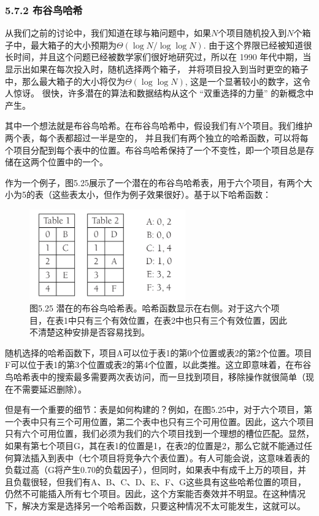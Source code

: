 \documentclass[a4paper]{ctexart}
\theoremstyle{definition}
\theoremstyle{definition}
\begin{document}
\subsubsection{5.7.2 布谷鸟哈希}

从我们之前的讨论中，我们知道在球与箱问题中，如果\( N \)个项目随机投入到\( N \)个箱子中，最大箱子的大小预期为\( \Theta(\log N / \log \log N) \). 
由于这个界限已经被知道很长时间，并且这个问题已经被数学家们很好地研究过，所以在 1990 年代中期，当显示出如果在每次投入时，随机选择两个箱子，
并将项目投入到当时更空的箱子中，那么最大箱子的大小将仅为\( \Theta(\log \log N) \), 这是一个显著较小的数字，这令人惊讶。
很快，许多潜在的算法和数据结构从这个 ``双重选择的力量'' 的新概念中产生。

其中一个想法就是布谷鸟哈希。在布谷鸟哈希中，假设我们有\( N \)个项目。我们维护两个表，每个表都超过一半是空的，
并且我们有两个独立的哈希函数，可以将每个项目分配到每个表中的位置。布谷鸟哈希保持了一个不变性，即一个项目总是存储在这两个位置中的一个。

作为一个例子，图5.25展示了一个潜在的布谷鸟哈希表，用于六个项目，有两个大小为5的表（这些表太小，但作为例子效果很好）。基于以下哈希函数：

\begin{figure}
  \centering
  \includegraphics[width=0.6\textwidth]{images/cuckoo.png}
  \caption{图5.25 潜在的布谷鸟哈希表。哈希函数显示在右侧。对于这六个项目，在表1中只有三个有效位置，在表2中也只有三个有效位置，因此不清楚这种安排是否容易找到。}
  \label{fig:bubble_hash}
\end{figure}

随机选择的哈希函数下，项目A可以位于表1的第0个位置或表2的第2个位置。项目F可以位于表1的第3个位置或表2的第4个位置，以此类推。这立即意味着，在布谷鸟哈希表中的搜索最多需要两次表访问，而一旦找到项目，移除操作就很简单（现在不需要延迟删除）。

但是有一个重要的细节：表是如何构建的？例如，在图5.25中，对于六个项目，第一个表中只有三个可用位置，第二个表中也只有三个可用位置。因此，这六个项目只有六个可用位置，我们必须为我们的六个项目找到一个理想的槽位匹配。显然，如果有第七个项目G，其在表1的位置是1，在表2的位置是2，那么它就不能通过任何算法插入到表中（七个项目将竞争六个表位置）。有人可能会说，这意味着表的负载过高（G将产生0.70的负载因子），但同时，如果表中有成千上万的项目，并且负载很轻，但我们有A、B、C、D、E、F、G这些具有这些哈希位置的项目，仍然不可能插入所有七个项目。因此，这个方案能否奏效并不明显。在这种情况下，解决方案是选择另一个哈希函数，只要这种情况不太可能发生，这就可以。
\end{document}
